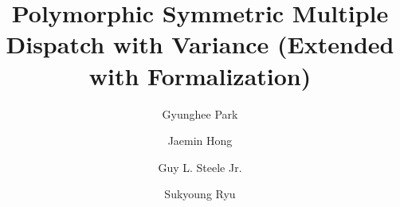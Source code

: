 \documentclass[acmsmall,10pt]{acmart}
\begin{document}
\title{Polymorphic Symmetric Multiple Dispatch with Variance (Extended with Formalization)
}


\author{Gyunghee Park}

\author{Jaemin Hong}

\author{Guy L. Steele Jr.}

\author{Sukyoung Ryu}
\end{document}

